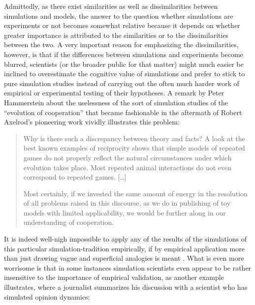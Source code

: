 \documentclass[onecollarge]{STJour}
\numberwithin{equation}{section}
\begin{document}
Admittedly, as there exist similarities as well as dissimilarities
between simulations and models, the answer to the question whether
simulations are experiments or not becomes somewhat relative because it
depends on whether greater importance is attributed to the similarities
or to the dissimilarities between the two. A very important reason for
emphasizing the dissimilarities, however, is that if the differences
between simulations and experiments become blurred, scientists (or the
broader public for that matter) might much easier be inclined to
overestimate the cognitive value of simulations and prefer to stick to
pure simulation studies instead of carrying out the often much harder
work of empirical or experimental testing of their hypotheses. A remark
by Peter Hammerstein about the uselessness of the sort of simulation
studies of the ``evolution of cooperation'' that became fashionable in
the aftermath of Robert Axelrod's pioneering work
\citep{axelrod:1984} vividly illustrates this problem:

\begin{quote}
Why is there such
a discrepancy between theory and facts? A look at the best known examples
of reciprocity shows that simple models of repeated games do not properly
reflect the natural circumstances under which evolution takes place. Most
repeated animal interactions do not even correspond to repeated
games. \citep[p.\ 83]{hammerstein:2003} [\ldots]

Most certainly, if we invested the same amount of energy in
the resolution of all problems raised in this discourse, as we do in
publishing of toy models with limited applicability, we would be further
along in our understanding of cooperation. 
\citep[p.\ 92]{hammerstein:2003}
\end{quote}

It is indeed well-nigh impossible to apply any of the results of the
simulations of this particular simulation-tradition empirically, if by
empirical application more than just drawing vague and superficial
analogies is meant \citep[p.\ 145ff.]{arnold:2008}. What is even more
worrisome is that in some instances simulation scientists even appear to
be rather insensitive to the importance of empirical validation, as
another example illustrates, where a journalist summarizes his discussion
with a scientist who has simulated opinion dynamics:
\end{document}

